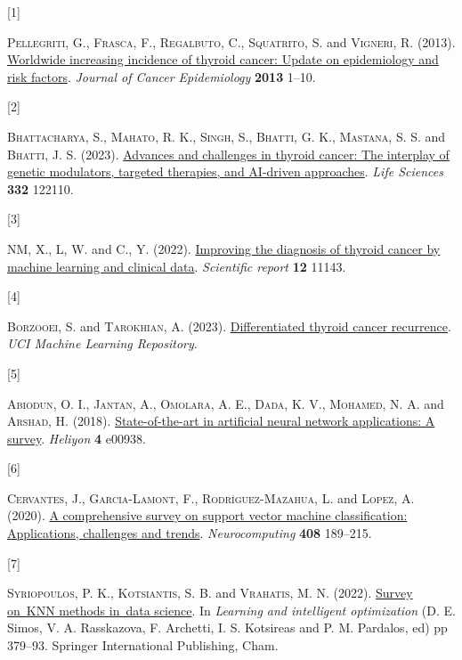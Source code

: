\documentclass[
  letterpaper,
  DIV=11,
  numbers=noendperiod]{scrartcl}
\newlength{\cslhangindent}
\newlength{\csllabelwidth}
\newenvironment{CSLReferences}[2] %
 {\begin{list}{}{%
  \setlength{\itemindent}{0pt}
  \setlength{\leftmargin}{0pt}
  \setlength{\parsep}{0pt}
  \ifodd #1
   \setlength{\leftmargin}{\cslhangindent}
   \setlength{\itemindent}{-1\cslhangindent}
  \fi
  \setlength{\itemsep}{#2\baselineskip}}}
 {\end{list}}
\newcommand{\CSLLeftMargin}[1]{\parbox[t]{\csllabelwidth}{\strut#1\strut}}
\newcommand{\CSLRightInline}[1]{\parbox[t]{\linewidth - \csllabelwidth}{\strut#1\strut}}
\begin{document}
\label{refs}
\begin{CSLReferences}{0}{1}
\CSLLeftMargin{{[}1{]} }%
\CSLRightInline{\textsc{Pellegriti}, G., \textsc{Frasca}, F.,
\textsc{Regalbuto}, C., \textsc{Squatrito}, S. and \textsc{Vigneri}, R.
(2013). \href{https://doi.org/10.1155/2013/965212}{Worldwide increasing
incidence of thyroid cancer: Update on epidemiology and risk factors}.
\emph{Journal of Cancer Epidemiology} \textbf{2013} 1--10.}

\CSLLeftMargin{{[}2{]} }%
\CSLRightInline{\textsc{Bhattacharya}, S., \textsc{Mahato}, R. K.,
\textsc{Singh}, S., \textsc{Bhatti}, G. K., \textsc{Mastana}, S. S. and
\textsc{Bhatti}, J. S. (2023).
\href{https://doi.org/10.1016/j.lfs.2023.122110}{Advances and challenges
in thyroid cancer: The interplay of genetic modulators, targeted
therapies, and AI-driven approaches}. \emph{Life Sciences} \textbf{332}
122110.}

\CSLLeftMargin{{[}3{]} }%
\CSLRightInline{\textsc{NM}, X., \textsc{L}, W. and \textsc{C.}, Y.
(2022). \href{https://doi.org/10.1038/s41598-022-15342-z}{Improving the
diagnosis of thyroid cancer by machine learning and clinical data}.
\emph{Scientific report} \textbf{12} 11143.}

\CSLLeftMargin{{[}4{]} }%
\CSLRightInline{\textsc{Borzooei}, S. and \textsc{Tarokhian}, A. (2023).
\href{https://doi.org/10.24432/C5632J}{Differentiated thyroid cancer
recurrence}. \emph{UCI Machine Learning Repository}.}

\CSLLeftMargin{{[}5{]} }%
\CSLRightInline{\textsc{Abiodun}, O. I., \textsc{Jantan}, A.,
\textsc{Omolara}, A. E., \textsc{Dada}, K. V., \textsc{Mohamed}, N. A.
and \textsc{Arshad}, H. (2018).
\href{https://doi.org/10.1016/j.heliyon.2018.e00938}{State-of-the-art in
artificial neural network applications: A survey}. \emph{Heliyon}
\textbf{4} e00938.}

\CSLLeftMargin{{[}6{]} }%
\CSLRightInline{\textsc{Cervantes}, J., \textsc{Garcia-Lamont}, F.,
\textsc{Rodríguez-Mazahua}, L. and \textsc{Lopez}, A. (2020).
\href{https://doi.org/10.1016/j.neucom.2019.10.118}{A comprehensive
survey on support vector machine classification: Applications,
challenges and trends}. \emph{Neurocomputing} \textbf{408} 189--215.}

\CSLLeftMargin{{[}7{]} }%
\CSLRightInline{\textsc{Syriopoulos}, P. K., \textsc{Kotsiantis}, S. B.
and \textsc{Vrahatis}, M. N. (2022).
\href{https://doi.org/10.1007/978-3-031-24866-5_28}{Survey on~KNN
methods in~data science}. In \emph{Learning and intelligent
optimization} (D. E. Simos, V. A. Rasskazova, F. Archetti, I. S.
Kotsireas and P. M. Pardalos, ed) pp 379--93. Springer International
Publishing, Cham.}


\end{CSLReferences}
\end{document}
